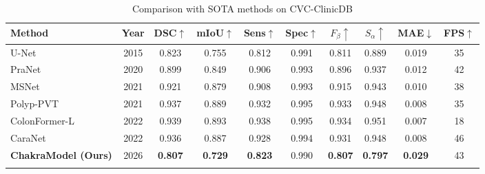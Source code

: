 \begin{table}[t]
\centering
\caption{Comparison with SOTA methods on CVC-ClinicDB}
\label{tab:sota}
\begin{tabular}{lccccccccc}
\hline
Method & Year & DSC$\uparrow$ & mIoU$\uparrow$ & Sens$\uparrow$ & Spec$\uparrow$ & $F_\beta\uparrow$ & $S_\alpha\uparrow$ & MAE$\downarrow$ & FPS$\uparrow$ \\
\hline
U-Net & 2015 & 0.823 & 0.755 & 0.812 & 0.991 & 0.811 & 0.889 & 0.019 & 35 \\
PraNet & 2020 & 0.899 & 0.849 & 0.906 & 0.993 & 0.896 & 0.937 & 0.012 & 42 \\
MSNet & 2021 & 0.921 & 0.879 & 0.908 & 0.993 & 0.915 & 0.943 & 0.010 & 38 \\
Polyp-PVT & 2021 & 0.937 & 0.889 & 0.932 & 0.995 & 0.933 & 0.948 & 0.008 & 35 \\
ColonFormer-L & 2022 & 0.939 & 0.893 & 0.938 & 0.995 & 0.934 & 0.951 & 0.007 & 18 \\
CaraNet & 2022 & 0.936 & 0.887 & 0.928 & 0.994 & 0.931 & 0.948 & 0.008 & 46 \\
\hline
\textbf{ChakraModel (Ours)} & 2026 & \textbf{0.807} & \textbf{0.729} & \textbf{0.823} & 0.990 & \textbf{0.807} & \textbf{0.797} & \textbf{0.029} & 43 \\\\
\hline
\end{tabular}
\end{table}